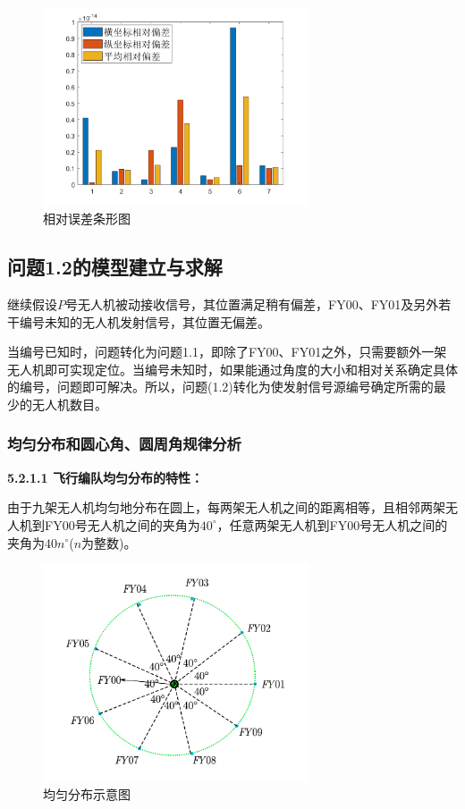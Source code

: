 \documentclass[12pt]{ctexart}
\begin{document}
\begin{spacing}{1.5}
\begin{figure}[H]
	\centering
	\includegraphics[width=0.7\textwidth]{e.png}
	\caption{相对误差条形图}
	\label{tux}
\end{figure}

\subsection{问题1.2的模型建立与求解}
继续假设$P$号无人机被动接收信号，其位置满足稍有偏差，FY00、FY01及另外若干编号未知的无人机发射信号，其位置无偏差。

当编号已知时，问题转化为问题1.1，即除了FY00、FY01之外，只需要额外一架无人机即可实现定位。当编号未知时，如果能通过角度的大小和相对关系确定具体的编号，问题即可解决。所以，问题(1.2)转化为使发射信号源编号确定所需的最少的无人机数目。

\subsubsection{均匀分布和圆心角、圆周角规律分析}
\textbf{5.2.1.1 飞行编队均匀分布的特性：}

由于九架无人机均匀地分布在圆上，每两架无人机之间的距离相等，且相邻两架无人机到FY00号无人机之间的夹角为$40^{\circ}$，任意两架无人机到FY00号无人机之间的夹角为$40n^{\circ}$($n$为整数)。
\begin{figure}[H]
	\centering
	\includegraphics[width=0.7\textwidth]{均匀分布图.png}
	\caption{均匀分布示意图}
	\label{tu5}
\end{figure}


\end{spacing}
\end{document}
